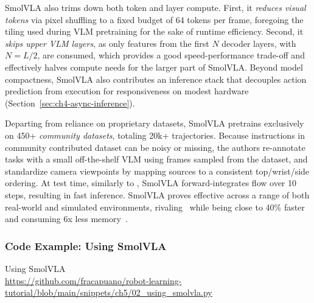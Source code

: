 SmolVLA also trims down both token and layer compute.
First, it \emph{reduces visual tokens} via pixel shuffling to a fixed budget of 64 tokens per frame, foregoing the tiling used during VLM pretraining for the sake of runtime efficiency. 
Second, it \emph{skips upper VLM layers}, as only features from the first \(N\) decoder layers, with \(N=L/2\), are consumed, which provides a good speed-performance trade-off and effectively halves compute needs for the larger part of SmolVLA.
Beyond model compactness, SmolVLA also contributes an inference stack that decouples action prediction from execution for responsiveness on modest hardware (Section~\ref{sec:ch4-async-inference}).

Departing from reliance on proprietary datasets, SmolVLA pretrains exclusively on 450+ \emph{community datasets}, totaling 20k+ trajectories. 
Because instructions in community contributed dataset can be noisy or missing, the authors re-annotate tasks with a small off-the-shelf VLM using frames sampled from the dataset, and standardize camera viewpoints by mapping sources to a consistent top/wrist/side ordering.
At test time, similarly to \pizero, SmolVLA forward-integrates flow over 10 steps, resulting in fast inference.
SmolVLA proves effective across a range of both real-world and simulated environments, rivaling \pizero~while being close to 40\% faster and consuming 6x less memory~\citep{shukorSmolVLAVisionLanguageActionModel2025}.

\subsubsection{Code Example: Using SmolVLA}
\begin{pbox}[label={ex:using-smolvla}]{Using SmolVLA \\ \url{https://github.com/fracapuano/robot-learning-tutorial/blob/main/snippets/ch5/02_using_smolvla.py}}
    
\end{pbox}
